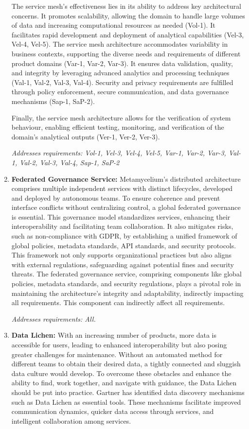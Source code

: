 \documentclass[preprint,12pt]{elsarticle}
\begin{document}
\begin{enumerate}
    The service mesh's effectiveness lies in its ability to address key architectural concerns. It promotes scalability, allowing the domain to handle large volumes of data and increasing computational resources as needed (Vol-1). It facilitates rapid development and deployment of analytical capabilities (Vel-3, Vel-4, Vel-5). The service mesh architecture accommodates variability in business contexts, supporting the diverse needs and requirements of different product domains (Var-1, Var-2, Var-3). It ensures data validation, quality, and integrity by leveraging advanced analytics and processing techniques (Val-1, Val-2, Val-3, Val-4). Security and privacy requirements are fulfilled through policy enforcement, secure communication, and data governance mechanisms (Sap-1, SaP-2). 
    
    Finally, the service mesh architecture allows for the verification of system behaviour, enabling efficient testing, monitoring, and verification of the domain's analytical outputs (Ver-1, Ver-2, Ver-3).

    \textit{Addresses requirements: Vol-1, Vel-3, Vel-4, Vel-5, Var-1, Var-2, Var-3, Val-1, Val-2, Val-3, Val-4, Sap-1, SaP-2} 
  
    \item  \textbf{Federated Governance Service:} Metamycelium's distributed architecture comprises multiple independent services with distinct lifecycles, developed and deployed by autonomous teams. To ensure coherence and prevent interface conflicts without centralizing control, a global federated governance is essential. This governance model standardizes services, enhancing their interoperability and facilitating team collaboration. It also mitigates risks, such as non-compliance with GDPR, by establishing a unified framework of global policies, metadata standards, API standards, and security protocols. This framework not only supports organizational practices but also aligns with external regulations, safeguarding against potential fines and security threats. The federated governance service, comprising components like global policies, metadata standards, and security regulations, plays a pivotal role in maintaining the architecture's integrity and adaptability, indirectly impacting all requirements. This component can indirectly affect all requirements.

    \textit{Addresses requirements: All.}     

    \item \textbf{Data Lichen:} With an increasing number of products, more data is accessible for users, leading to enhanced interoperability but also posing greater challenges for maintenance. Without an automated method for different teams to obtain their desired data, a tightly connected and sluggish data culture would develop. To overcome these obstacles and enhance the ability to find, work together, and navigate with guidance, the Data Lichen should be put into practice. Gartner has identified data discovery mechanisms such as Data Lichen as essential tools. These mechanisms facilitate improved communication dynamics, quicker data access through services, and intelligent collaboration among services.


\end{enumerate}
\end{document}
